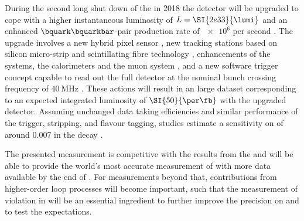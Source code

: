 During the second long shut down of the \LHC in 2018 the \LHCb detector will be
upgraded to cope with a higher instantaneous luminosity of $L =
\SI{2e33}{\lumi}$ and an enhanced $\bquark\bquarkbar$-pair production rate of
$\num{e6}$ per second \cite{Bediaga:1443882}. The upgrade involves a new hybrid
pixel sensor \VELO \cite{TDRVELO}, new tracking stations based on silicon
micro-strip and scintillating fibre technology \cite{TDRTracking}, enhancements
of the \RICH systems, the calorimeters and the muon system \cite{TDRPID}, and a
new software trigger concept capable to read out the full detector at the
nominal bunch crossing frequency of $\SI{40}{\mega\hertz}$ \cite{TDRTrigger}.
These actions will result in an large dataset corresponding to an expected
integrated luminosity of $\SI{50}{\per\fb}$ with the upgraded detector. Assuming
unchanged data taking efficiencies and similar performance of the trigger,
stripping, and flavour tagging, \ToyMC studies estimate a sensitivity on
\sintwobeta of around $\num{0.007}$ \cite{Moedden:2015} in the decay
\BdToJpsiKS.

The presented measurement is competitive with the results from the \BFactories and
\LHCb will be able to provide the world's most accurate measurement of
\sintwobeta with more data available by the end of \RunTwo. For measurements
beyond that, contributions from higher-order loop processes will become
important, such that the measurement of \CP violation in \BsToJpsiKS will be an
essential ingredient to further improve the precision on \sintwobeta and to test
the \SM expectations.


